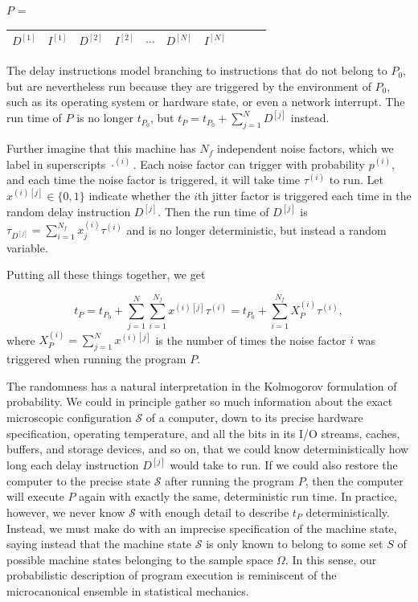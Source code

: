 \documentclass[conference]{IEEEtran}
\begin{document}
$P$ = \begin{tabular}{|c|c|c|c|c|c|c|c|c|c|}
\hline
$D^{[1]}$ & $I^{[1]}$ & $D^{[2]}$ & $I^{[2]}$ &
$\cdots$ & $D^{[N]}$ & $I^{[N]}$
\tabularnewline
\hline
\end{tabular}

The delay instructions model branching to instructions that do not belong to $P_0$, but are nevertheless run because they are triggered by the environment of $P_0$, such as its operating system or hardware state, or even a network interrupt. The run time of $P$ is no longer $t_{P_0}$, but
$t_P = t_{P_0} + \sum_{j=1}^N D^{[j]}$ instead.

Further imagine that this machine has $N_f$ independent noise factors, which we label in superscripts $\cdot^{(i)}$. Each noise factor can trigger with probability $p^{(i)}$, and each time the noise factor is triggered, it will take time $\tau^{(i)}$ to run. Let $x^{(i)[j]} \in \{0, 1\}$ indicate whether the $i$th jitter factor is triggered each time in the random delay instruction $D^{[j]}$. Then the run time of $D^{[j]}$ is
$\tau_{D^{[j]}} = \sum_{i=1}^{N_f} x^{(i)}_j \tau^{(i)}$ and is no longer deterministic, but instead a random variable.

Putting all these things together, we get

\begin{equation}
t_P = t_{P_0} + \sum_{j=1}^N \sum_{i=1}^{N_f} x^{(i)[j]} \tau^{(i)}
= t_{P_0} + \sum_{i=1}^{N_f} X_P^{(i)} \tau^{(i)},
\end{equation}
%
where $X_P^{(i)} = \sum_{j=1}^N x^{(i)[j]}$ is the number of times the noise factor $i$ was triggered when running the program $P$.

The randomness has a natural interpretation in the Kolmogorov formulation of probability. We could in principle gather so much information about the exact microscopic configuration $\mathcal S$ of a computer, down to its precise hardware specification, operating temperature, and all the bits in its I/O streams, caches, buffers, and storage devices, and so on, that we could know deterministically how long each delay instruction $D^{[j]}$ would take to run. If we could also restore the computer to the precise state $\mathcal S$ after running the program $P$, then the computer will execute $P$ again with exactly the same, deterministic run time. In practice, however, we never know $\mathcal S$ with enough detail to describe $t_P$ deterministically. Instead, we must make do with an imprecise specification of the machine state, saying instead that the machine state $\mathcal S$ is only known to belong to some set $S$ of possible machine states belonging to the sample space $\Omega$. In this sense, our probabilistic description of program execution is reminiscent of the microcanonical ensemble in statistical mechanics.
\end{document}
